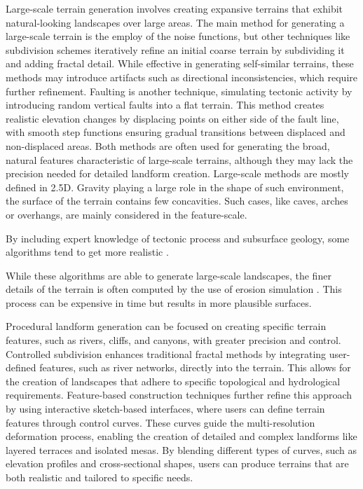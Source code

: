 Large-scale terrain generation involves creating expansive terrains that exhibit natural-looking landscapes over large areas. The main method for generating a large-scale terrain is the employ of the noise functions, but other techniques like subdivision schemes iteratively refine an initial coarse terrain by subdividing it and adding fractal detail. While effective in generating self-similar terrains, these methods may introduce artifacts such as directional inconsistencies, which require further refinement. Faulting is another technique, simulating tectonic activity by introducing random vertical faults into a flat terrain. This method creates realistic elevation changes by displacing points on either side of the fault line, with smooth step functions ensuring gradual transitions between displaced and non-displaced areas. Both methods are often used for generating the broad, natural features characteristic of large-scale terrains, although they may lack the precision needed for detailed landform creation. Large-scale methods are mostly defined in 2.5D. Gravity playing a large role in the shape of such environment, the surface of the terrain contains few concavities. Such cases, like caves, arches or overhangs, are mainly considered in the feature-scale.

By including expert knowledge of tectonic process and subsurface geology, some algorithms tend to get more realistic \cite{Patel2021, Cortial2019, Michel2016}. 

While these algorithms are able to generate large-scale landscapes, the finer details of the terrain is often computed by the use of erosion simulation \cite{Cordonnier2023, Schott2023, Paris2019}. This process can be expensive in time but results in more plausible surfaces.

Procedural landform generation can be focused on creating specific terrain features, such as rivers, cliffs, and canyons, with greater precision and control. Controlled subdivision enhances traditional fractal methods by integrating user-defined features, such as river networks, directly into the terrain. This allows for the creation of landscapes that adhere to specific topological and hydrological requirements. Feature-based construction techniques further refine this approach by using interactive sketch-based interfaces, where users can define terrain features through control curves. These curves guide the multi-resolution deformation process, enabling the creation of detailed and complex landforms like layered terraces and isolated mesas. By blending different types of curves, such as elevation profiles and cross-sectional shapes, users can produce terrains that are both realistic and tailored to specific needs.

